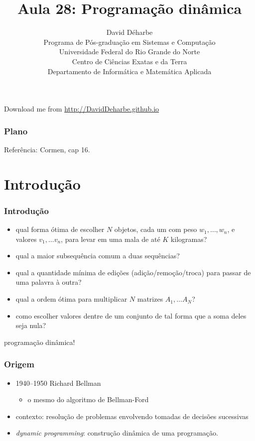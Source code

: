 \documentclass{beamer}
\title{Aula 28: Programação dinâmica}
\author{David Déharbe \\
  Programa de Pós-graduação em Sistemas e Computação \\
  Universidade Federal do Rio Grande do Norte \\
  Centro de Ciências Exatas e da Terra \\
  Departamento de Informática e Matemática Aplicada}
\date{}
\begin{document}


\begin{frame}
  \titlepage

  Download me from \url{http://DavidDeharbe.github.io}

\end{frame}

\begin{frame}
  \frametitle{Plano}

  \tableofcontents
Referência: Cormen, cap 16.
\end{frame}

\section{Introdução}


\begin{frame}
\frametitle{Introdução}

\begin{itemize}
\item qual forma ótima de escolher $N$ objetos, cada um com peso $w_1, \ldots,
  w_n$, e valores $v_1, \ldots v_n$, para levar em uma mala de até $K$
  kilogramas?
\item qual a maior subsequência comum a duas sequências?
\item qual a quantidade mínima de edições (adição/remoção/troca) para passar de uma palavra à outra?
\item qual a ordem ótima para multiplicar $N$ matrizes $A_1, \ldots A_N$?
\item como escolher valores dentre de um conjunto de tal forma que a soma deles seja nula?
\end{itemize}
\pause
\alert{programação dinâmica!}

\end{frame}


\begin{frame}
\frametitle{Origem}

\begin{itemize}
\item 1940--1950 Richard Bellman
\begin{itemize}
\item o mesmo do algoritmo de Bellman-Ford
\end{itemize}
\item contexto: resolução de problemas envolvendo tomadas de decisões sucessivas
\item \textit{dynamic programming}: construção dinâmica de uma programação.
\end{itemize}

\end{frame}
\end{document}
